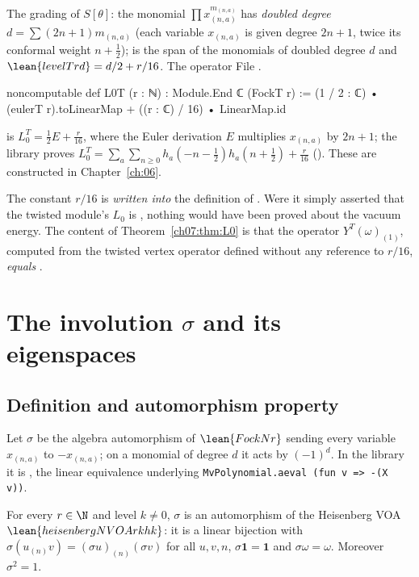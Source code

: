 The grading of $S[\theta]$: the monomial $\prod x_{(n,a)}^{m_{(n,a)}}$ has \emph{doubled degree}
$d = \sum (2n+1)m_{(n,a)}$ (each variable $x_{(n,a)}$ is given degree $2n+1$, twice its conformal weight $n+\frac12$);  is the span of the monomials of doubled degree $d$
and $\lean{levelT r d} = d/2 + r/16$. The operator
\noindent File .
\begin{leancode}
noncomputable def L0T (r : ℕ) : Module.End ℂ (FockT r) :=
  (1 / 2 : ℂ) • (eulerT r).toLinearMap + ((r : ℂ) / 16) • LinearMap.id
\end{leancode}
is $L_0^T = \frac12 E + \frac r{16}$, where the Euler derivation $E$ multiplies $x_{(n,a)}$ by
$2n+1$; the library proves $L_0^T = \sum_a\sum_{n\ge0}h_a(-n-\frac12)h_a(n+\frac12) +
\frac r{16}$ (). These are constructed in Chapter~\ref{ch:06}.

\begin{warning}
The constant $r/16$ is \emph{written into} the definition of . Were it simply
asserted that the twisted module's $L_0$ is , nothing would have been proved about the
vacuum energy. The content of Theorem~\ref{ch07:thm:L0} is that the operator
$Y^T(\omega)_{(1)}$, computed from the twisted vertex operator defined without any reference to
$r/16$, \emph{equals} .
\end{warning}

\section{The involution \texorpdfstring{$\sigma$}{sigma} and its eigenspaces}\label{ch07:sec:sigma}

\subsection{Definition and automorphism property}

Let $\sigma$ be the algebra automorphism of $\lean{FockN r}$ sending every variable $x_{(n,a)}$
to $-x_{(n,a)}$; on a monomial of degree $d$ it acts by $(-1)^d$. In the library it is
, the linear equivalence underlying
\verb|MvPolynomial.aeval (fun v => -(X v))|.

\begin{theorem}\label{ch07:thm:sigmaaut}
For every $r\in\N$ and level $k\ne0$, $\sigma$ is an automorphism of the Heisenberg VOA
$\lean{heisenbergNVOA r k hk}$: it is a linear bijection with $\sigma(u_{(n)}v) =
(\sigma u)_{(n)}(\sigma v)$ for all $u,v,n$, $\sigma\mathbf 1 = \mathbf 1$ and $\sigma\omega
=\omega$. Moreover $\sigma^2 = 1$.
\end{theorem}

